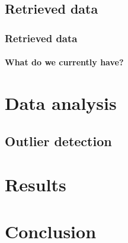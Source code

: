 \documentclass[nonav,sleutel]{beamer}
\begin{document}
\subsection{Retrieved data}
\begin{frame}
\frametitle{Retrieved data}
\framesubtitle{What do we currently have?}

\end{frame}


\section{Data analysis}
\subsection{Outlier detection}
\section{Results}

\section{Conclusion}
\end{document}
